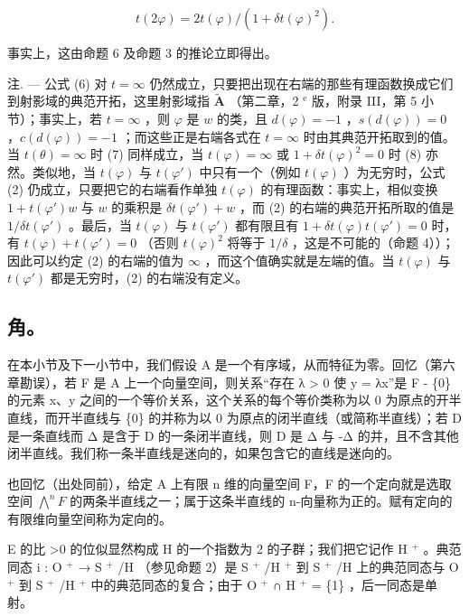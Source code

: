 \[
t (2 \varphi) = 2 t (\varphi) / (1 + \delta t (\varphi) ^ {2}).\tag{8}
\]

事实上，这由命题 6 及命题 3 的推论立即得出。

注. --- 公式 (6) 对 \(t = \infty\) 仍然成立，只要把出现在右端的那些有理函数换成它们到射影域的典范开拓，这里射影域指 \(\tilde{\mathbf{A}}\) （第二章，2 \(^{\text{e}}\) 版，附录 III，第 5 小节）；事实上，若 \(t = \infty\) ，则 \(\varphi\) 是 \(w\) 的类，且 \(d(\varphi) = -1\) ，\(s(d(\varphi)) = 0\) ，\(c(d(\varphi)) = -1\) ；而这些正是右端各式在 \(t = \infty\) 时由其典范开拓取到的值。当 \(t(\theta) = \infty\) 时 (7) 同样成立，当 \(t(\varphi) = \infty\) 或 \(1 + \delta t(\varphi)^{2} = 0\) 时 (8) 亦然。类似地，当 \(t(\varphi)\) 与 \(t(\varphi')\) 中只有一个（例如 \(t(\varphi)\) ）为无穷时，公式 (2) 仍成立，只要把它的右端看作单独 \(t(\varphi)\) 的有理函数：事实上，相似变换 \(1 + t(\varphi')w\) 与 \(w\) 的乘积是 \(\delta t(\varphi') + w\) ，而 (2) 的右端的典范开拓所取的值是 \(1/\delta t(\varphi')\) 。最后，当 \(t(\varphi)\) 与 \(t(\varphi')\) 都有限且有 \(1 + \delta t(\varphi)t(\varphi') = 0\) 时，有 \(t(\varphi) + t(\varphi') = 0\) （否则 \(t(\varphi)^{2}\) 将等于 \(1/\delta\) ，这是不可能的（命题 4））；因此可以约定 (2) 的右端的值为 \(\infty\) ，而这个值确实就是左端的值。当 \(t(\varphi)\) 与 \(t(\varphi')\) 都是无穷时，(2) 的右端没有定义。

\subsection{角。}

在本小节及下一小节中，我们假设 A 是一个有序域，从而特征为零。回忆（第六章勘误），若 F 是 A 上一个向量空间，则关系“存在 λ \textgreater{} 0 使 y = λx”是 F - \{0\} 的元素 x、y 之间的一个等价关系，这个关系的每个等价类称为以 0 为原点的开半直线，而开半直线与 \{0\} 的并称为以 0 为原点的闭半直线（或简称半直线）；若 D 是一条直线而 Δ 是含于 D 的一条闭半直线，则 D 是 Δ 与 -Δ 的并，且不含其他闭半直线。我们称一条半直线是迷向的，如果包含它的直线是迷向的。

也回忆（出处同前），给定 A 上有限 n 维的向量空间 F，F 的一个定向就是选取空间 \(\bigwedge^{n}F\) 的两条半直线之一；属于这条半直线的 n-向量称为正的。赋有定向的有限维向量空间称为定向的。

E 的比 \textgreater0 的位似显然构成 H 的一个指数为 2 的子群；我们把它记作 H \(^{+}\) 。典范同态 i : O \(^{+}\) → S \(^{+}\) /H （参见命题 2）是 S \(^{+}\) /H \(^{+}\) 到 S \(^{+}\) /H 上的典范同态与 O \(^{+}\) 到 S \(^{+}\) /H \(^{+}\) 中的典范同态的复合；由于 O \(^{+}\) ∩ H \(^{+}\) = \{1\} ，后一同态是单射。


